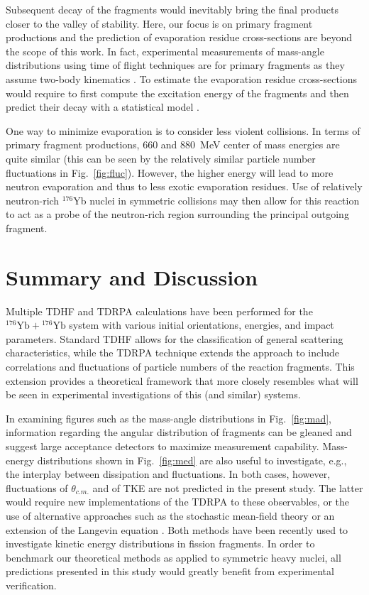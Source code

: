 Subsequent decay of the fragments would inevitably bring the final products closer to the valley of stability.
Here, our focus is on primary fragment productions and the prediction of evaporation residue cross-sections are beyond the scope of this work.
In fact, experimental measurements of mass-angle distributions using time of flight techniques are for primary fragments as they assume two-body kinematics \citep{thomas2008}. 
To estimate the evaporation residue cross-sections would require to first compute the excitation energy of the fragments and then predict their decay with a statistical model \citep{umar2017,sekizawa2017}. 

One way to minimize evaporation is to consider less violent collisions. 
In terms of primary fragment productions, 660 and 880~MeV center of mass energies are quite similar (this can be seen by the relatively similar particle number fluctuations in Fig.~\ref{fig:fluc}). 
However, the higher energy will lead to more neutron evaporation and thus to less exotic evaporation residues. 
Use of relatively neutron-rich $^{176}$Yb nuclei in symmetric collisions may then allow for this reaction to act as a probe of the neutron-rich region surrounding the principal outgoing fragment.


\section{Summary and Discussion}\label{sec:conclusions}

Multiple TDHF and TDRPA calculations have been performed for the $^{176}\mathrm{Yb}+{}^{176}\mathrm{Yb}$ system with various initial orientations, energies, and impact parameters.
Standard TDHF allows for the classification of general scattering characteristics, while the TDRPA technique extends the approach to include correlations and fluctuations of particle numbers of the reaction fragments.
This extension provides a theoretical framework that more closely resembles what will be seen in experimental investigations of this (and similar) systems.

In examining figures such as the mass-angle distributions in Fig.~\ref{fig:mad}, information regarding the angular distribution of fragments can be gleaned and suggest large acceptance detectors to maximize measurement capability.
Mass-energy distributions shown in Fig.~\ref{fig:med} are also useful to investigate, e.g., the interplay between dissipation and fluctuations. 
In both cases, however, fluctuations of $\theta_{c.m.}$ and of TKE are not predicted in the present study.
The latter would require new implementations of the TDRPA to these observables, or the use of alternative approaches such as the stochastic mean-field theory \citep{tanimura2017} or an extension of the Langevin equation \citep{bulgac2019}. 
Both methods have been recently used to investigate kinetic energy distributions in fission fragments. 
In order to benchmark our theoretical methods as applied to symmetric heavy nuclei, all predictions presented in this study would greatly benefit from experimental verification.

